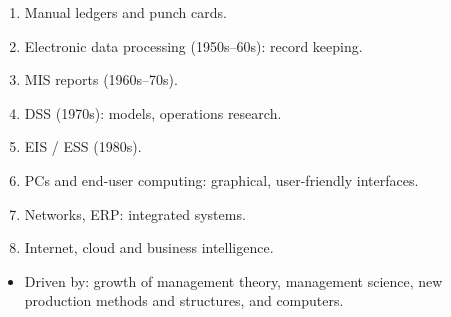 {\color{sub}\footnotesize \tN}
\begin{enumerate}
  \item Manual ledgers and punch cards.
  \item Electronic data processing (1950s--60s): record keeping.
  \item MIS reports (1960s--70s).
  \item DSS (1970s): models, operations research.
  \item EIS / ESS (1980s).
  \item PCs and end-user computing: graphical, user-friendly interfaces.
  \item Networks, ERP: integrated systems.
  \item Internet, cloud and business intelligence.
\end{enumerate}
\begin{itemize}
  \item Driven by: growth of management theory, management science, new production methods
    and structures, and computers.
\end{itemize}

\vspace{2pt}


